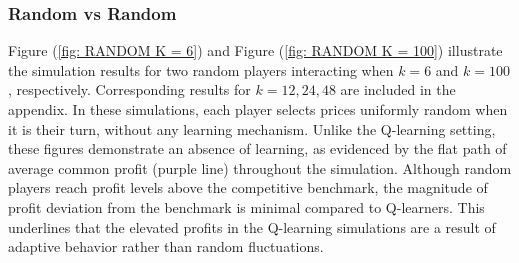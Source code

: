 \documentclass{article}
\begin{document}
\subsubsection{Random vs Random}
\label{RvsR}
Figure (\ref{fig: RANDOM K = 6}) and Figure (\ref{fig: RANDOM K = 100}) illustrate the simulation results for two random players interacting when $ k = 6 $ and $ k = 100 $, respectively. Corresponding results for $ k = 12, 24, 48 $ are included in the appendix. In these simulations, each player selects prices uniformly random when it is their turn, without any learning mechanism.
\newline
Unlike the Q-learning setting, these figures demonstrate an absence of learning, as evidenced by the flat path of average common profit (purple line) throughout the simulation. 
\newline
Although random players reach profit levels above the competitive benchmark, the magnitude of profit deviation from the benchmark is minimal compared to Q-learners. This underlines that the elevated profits in the Q-learning simulations are a result of adaptive behavior rather than random fluctuations.
\end{document}
